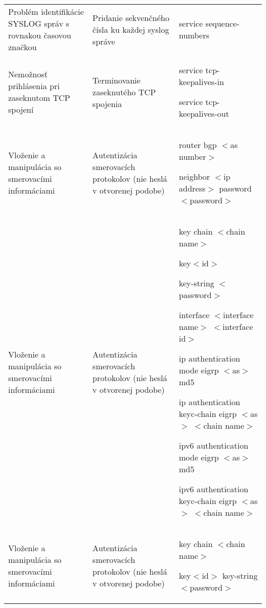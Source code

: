 \begin{longtable}[!htbp]{|L{10em}L{10em}>{\selectfont}L{34em}|}
	
	
	
	Problém identifikácie SYSLOG správ s rovnakou časovou značkou	&Pridanie sekvenčného čísla ku každej syslog správe	&service sequence-numbers\\
	
	
	
	
	 Nemožnosť prihlásenia pri zaseknutom TCP spojení	&Terminovanie zaseknutého TCP spojenia	&service tcp-keepalives-in
	
	service tcp-keepalives-out\\
	
	
	
	
	Vloženie a manipulácia so smerovacími informáciami	&Autentizácia smerovacích protokolov (nie heslá v otvorenej podobe)	&router bgp $<$as number$>$
	
	\hspace{0.5em}neighbor $<$ip address$>$ password $<$password$>$  \\
	
	
	
	
	 Vloženie a manipulácia so smerovacími informáciami	&Autentizácia smerovacích protokolov (nie heslá v otvorenej podobe)	&key chain $<$chain name$>$
	
	\hspace{0.5em}key$<$id$>$
	
	\hspace{1em}key-string $<$password$>$
	
	interface $<$interface name$>$ $<$interface id$>$
	
	\hspace{0.5em}ip authentication mode eigrp $<$as$>$ md5
	
	\hspace{0.5em}ip authentication keyc-chain eigrp $<$as$>$ $<$chain name$>$
	
	\hspace{0.5em}ipv6 authentication mode eigrp $<$as$>$ md5
	
	\hspace{0.5em}ipv6 authentication keyc-chain eigrp $<$as$>$ $<$chain name$>$\\
	
	
	
	
	Vloženie a manipulácia so smerovacími informáciami	&Autentizácia smerovacích protokolov (nie heslá v otvorenej podobe)	&key chain $<$chain name$>$
	
	\hspace{0.5em}key$<$id$>$
	\hspace{1em}key-string $<$password$>$
	

\end{longtable}
